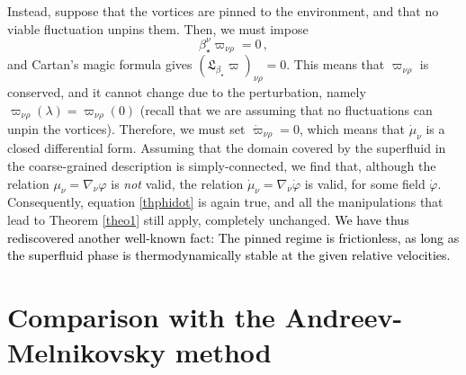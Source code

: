 \documentclass[a4paper, amsfonts, amssymb, amsmath, reprint, showkeys, nofootinbib, twoside,notitlepage,onecolumn]{revtex4-2}
\theoremstyle{definition}
\theoremstyle{theorem}
\theoremstyle{corollary}
\begin{document}
Instead, suppose that the vortices are pinned to the environment, and that no viable fluctuation unpins them. Then, we must impose \cite{langlois98}
\begin{equation}
\beta_\star^\nu \varpi_{\nu \rho}=0 \, ,
\end{equation}
and Cartan's magic formula gives $(\mathfrak{L}_{\beta_\star}\varpi)_{\nu \rho}=0$. This means that $\varpi_{\nu \rho}$ is conserved, and it cannot change due to the perturbation, namely $\varpi_{\nu \rho}(\lambda)=\varpi_{\nu \rho}(0)$ (recall that we are assuming that no fluctuations can unpin the vortices). Therefore, we must set $\dot{\varpi}_{\nu \rho}=0$, which means that $\dot{\mu}_\nu$ is a closed differential form. Assuming that the domain covered by the superfluid in the coarse-grained description is simply-connected, we find that, although the relation $\mu_\nu=\nabla_\nu \varphi$ is \textit{not} valid, the relation $\dot{\mu}_\nu=\nabla_\nu \dot{\varphi}$ is valid, for some field $\dot{\varphi}$. Consequently, equation \eqref{thphidot} is again true, and all the manipulations that lead to Theorem \ref{theo1} still apply, completely unchanged. \textcolor{black}{We have thus rediscovered another well-known fact: The pinned regime is frictionless, as long as the superfluid phase is thermodynamically stable at the given relative velocities.}





\section{Comparison with the Andreev-Melnikovsky method}\label{comparisonwithandreev}
\end{document}
